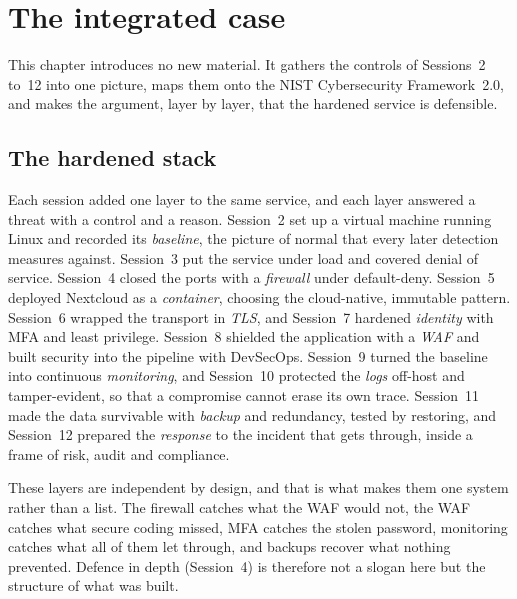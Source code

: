 \chapter{The integrated case}

This chapter introduces no new material. It gathers the controls of
Sessions~2 to~12 into one picture, maps them onto the NIST Cybersecurity
Framework~2.0, and makes the argument, layer by layer, that the hardened
service is defensible.

\section{The hardened stack}

Each session added one layer to the same service, and each layer answered a
threat with a control and a reason. Session~2 set up a virtual machine
running Linux and recorded its \emph{baseline}, the picture of normal that
every later detection measures against. Session~3 put the service under
load and covered denial of service. Session~4 closed the ports with a
\emph{firewall} under default-deny. Session~5 deployed Nextcloud as a
\emph{container}, choosing the cloud-native, immutable pattern. Session~6
wrapped the transport in \emph{TLS}, and Session~7 hardened \emph{identity}
with MFA and least privilege. Session~8 shielded the application with a
\emph{WAF} and built security into the pipeline with DevSecOps. Session~9
turned the baseline into continuous \emph{monitoring}, and Session~10
protected the \emph{logs} off-host and tamper-evident, so that a compromise
cannot erase its own trace. Session~11 made the data survivable with
\emph{backup} and redundancy, tested by restoring, and Session~12 prepared
the \emph{response} to the incident that gets through, inside a frame of
risk, audit and compliance.

These layers are independent by design, and that is what makes them one
system rather than a list. The firewall catches what the WAF would not, the
WAF catches what secure coding missed, MFA catches the stolen password,
monitoring catches what all of them let through, and backups recover what
nothing prevented. Defence in depth (Session~4) is therefore not a slogan
here but the structure of what was built.

